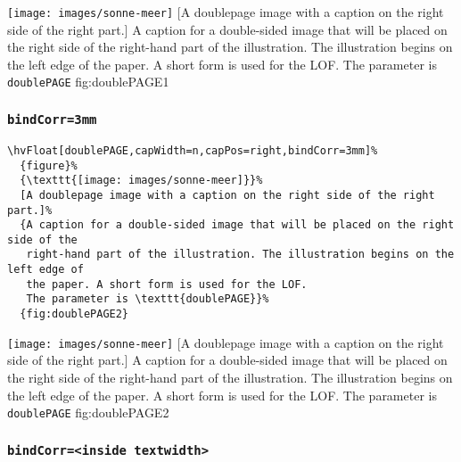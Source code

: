 \documentclass[twoside]{scrartcl}
\makeatletter
\let\hvBlindtext\Blindtext
\def\Blindtext{\par\color{black!40}\hvBlindtext\par\normalcolor}
\def\hvblindtext{\textcolor{black!40}{\blindtext@text}}
\makeatother
\begin{document}
%
  {\texttt{[image: images/sonne-meer]}}%
  [A doublepage image with a caption on the right side of the right part.]%
  {A caption for a double-sided image that will be placed on the right side of the
   right-hand part of the illustration. The illustration begins on the left edge of 
   the paper. A short form is used for the LOF. 
   The parameter is \texttt{doublePAGE}}%
  {fig:doublePAGE1}

\hvblindtext

\Blindtext

\Blindtext

\subsubsection{\texttt{bindCorr=3mm}}

\begin{lstlisting}
\hvFloat[doublePAGE,capWidth=n,capPos=right,bindCorr=3mm]%
  {figure}%
  {\texttt{[image: images/sonne-meer]}}%
  [A doublepage image with a caption on the right side of the right part.]%
  {A caption for a double-sided image that will be placed on the right side of the
   right-hand part of the illustration. The illustration begins on the left edge of 
   the paper. A short form is used for the LOF. 
   The parameter is \texttt{doublePAGE}}%
  {fig:doublePAGE2}
\end{lstlisting}

%
  {\texttt{[image: images/sonne-meer]}}%
  [A doublepage image with a caption on the right side of the right part.]%
  {A caption for a double-sided image that will be placed on the right side of the
   right-hand part of the illustration. The illustration begins on the left edge of 
   the paper. A short form is used for the LOF. 
   The parameter is \texttt{doublePAGE}}%
  {fig:doublePAGE2}



\Blindtext

\Blindtext

\hvblindtext

\subsubsection{\texttt{bindCorr=<inside textwidth>}}
\end{document}
